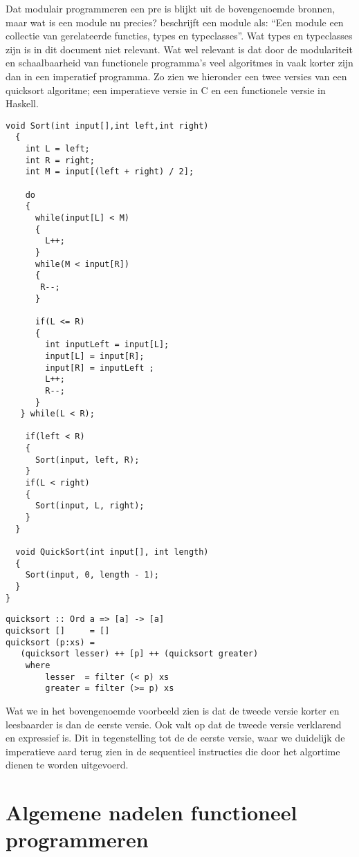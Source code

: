 \documentclass[twoside,twocolumn]{article}
\begin{document}
Dat modulair programmeren een pre is blijkt uit de bovengenoemde bronnen, maar
wat is een module nu precies? \textcite[hdfst.~6]{src16} beschrijft een module
als: \enquote{Een module een collectie van gerelateerde functies, types en
typeclasses}. Wat types en typeclasses zijn is in dit document niet relevant.
Wat wel relevant is dat door de modulariteit en schaalbaarheid van functionele
programma's veel algoritmes in vaak korter zijn dan in een imperatief
programma. Zo zien we hieronder een twee versies van een quicksort algoritme;
een imperatieve versie in C en een functionele versie in Haskell.

\begin{lstlisting}[style=CStyle]
  void Sort(int input[],int left,int right)
  {
    int L = left;
    int R = right;
    int M = input[(left + right) / 2];

    do
    {
      while(input[L] < M)
      {
        L++;
      }
      while(M < input[R])
      {
       R--;
      }

      if(L <= R)
      {
        int inputLeft = input[L];
        input[L] = input[R];
        input[R] = inputLeft ;
        L++;
        R--;
      }
   } while(L < R);

    if(left < R)
    {
      Sort(input, left, R);
    }
    if(L < right)
    {
      Sort(input, L, right);
    }
  }

  void QuickSort(int input[], int length)
  {
    Sort(input, 0, length - 1);
  }
}
\end{lstlisting}

\begin{lstlisting}[style=HsStyle]
quicksort :: Ord a => [a] -> [a]
quicksort []     = []
quicksort (p:xs) =
   (quicksort lesser) ++ [p] ++ (quicksort greater)
    where
        lesser  = filter (< p) xs
        greater = filter (>= p) xs
\end{lstlisting}

Wat we in het bovengenoemde voorbeeld zien is dat de tweede versie korter
en leesbaarder is dan de eerste versie. Ook valt op dat de tweede versie
verklarend en expressief is. Dit in tegenstelling tot de de eerste versie, waar
we duidelijk de imperatieve aard terug zien in de sequentieel instructies die
door het algortime dienen te worden uitgevoerd.



\section{Algemene nadelen functioneel programmeren}
\label{sec:4}
\end{document}
